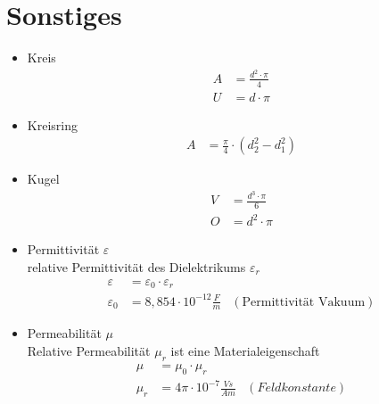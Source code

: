 \section{Sonstiges}
\begin{itemize}
	\item Kreis
	      \begin{align*}
		      A & = \frac{d^2\cdot\pi}{4} \\
		      U & = d\cdot\pi
	      \end{align*}
	\item Kreisring
	      \begin{align*}
		      A & = \frac{\pi}{4} \cdot (d_2^2-d_1^2)
	      \end{align*}
	\item Kugel
	      \begin{align*}
		      V & = \frac{d^3\cdot \pi}{6} \\
		      O & = d^2\cdot \pi
	      \end{align*}
	\item Permittivität $ \varepsilon $\\
	      relative Permittivität des Dielektrikums $ \varepsilon_r $
	      \begin{align*}
		      \varepsilon   & =\varepsilon_0\cdot\varepsilon_r                                 \\
		      \varepsilon_0 & =8,854\cdot 10^{-12} \frac{F}{m} & (\text{Permittivität Vakuum})
	      \end{align*}
	\item Permeabilität $ \mu $\\
	      Relative Permeabilität $ \mu_r $ ist eine Materialeigenschaft
	      \begin{align*}
		      \mu   & =\mu_0\cdot\mu_r                                  \\
		      \mu_r & =4\pi\cdot10^{-7} \frac{Vs}{Am} & (Feldkonstante)
	      \end{align*}
\end{itemize}
